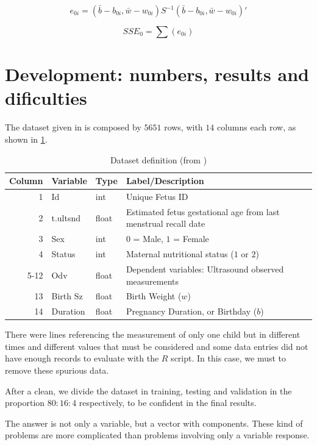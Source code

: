 \documentclass[10pt,twocolumn,letterpaper]{article}
\begin{document}
\begin{equation}
e_{0i} = (\bar{b} - b_{0i}, \bar{w} - w_{0i})S^{-1}(\bar{b} - b_{0i}, \bar{w} - w_{0i})' 
\label{eq:e0i}
\end{equation}

$$SSE_0 = \sum(e_{0i})$$

\section{Development: numbers, results and dificulties}

The dataset given in \cite{topcoder} is composed by $5651$ rows, with $14$ columns each row, as shown in \ref{table:definitions}.
\begin{table}
\label{table:definitions}
\begin{center}
\begin{tabular}{rlll}
Column  & Variable  & Type  &  Label/Description \\
\hline
   1    & Id        & int   &  Unique Fetus ID \\
   2    & t.ultsnd  & float &  Estimated fetus gestational age from last menstrual recall date \\
   3    & Sex       & int   &  $0$ = Male, $1$ = Female \\
   4    & Status    & int   &  Maternal nutritional status ($1$ or $2$) \\
 5-12   & Odv       & float &  Dependent variables: Ultrasound observed measurements \\
  13    & Birth Sz  & float &  Birth Weight ($w$) \\
  14    & Duration  & float &  Pregnancy Duration, or Birthday ($b$) \\
\end{tabular} 
\caption {Dataset definition (from \cite{topcoder})}	
\end{center}
\end{table}

There were lines referencing the measurement of only one child but in different times and different values that must be considered and some data entries did not have enough records to evaluate with the $R$ script. In this case, we must to remove these spurious data.

After a clean, we divide the dataset in training, testing and validation in the proportion $80 : 16 : 4$ respectively, to be confident in the final results.

The answer is not only a variable, but a vector with components. These kind of problems are more complicated than problems involving only a variable response.
\end{document}
